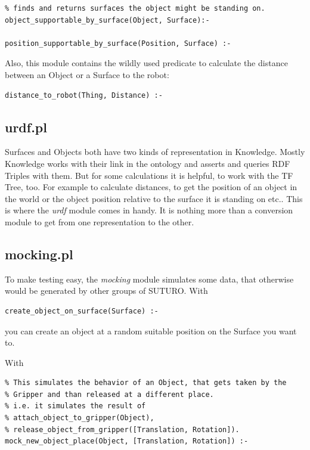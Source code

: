 \documentclass[main.tex]{subfiles}
\begin{document}
\begin{lstlisting}
% finds and returns surfaces the object might be standing on.
object_supportable_by_surface(Object, Surface):-

position_supportable_by_surface(Position, Surface) :-
\end{lstlisting}

Also, this module contains the wildly used predicate to calculate the distance between an Object or a Surface to the robot:

\begin{lstlisting}
distance_to_robot(Thing, Distance) :-
\end{lstlisting}

\subsection{urdf.pl}

Surfaces and Objects both have two kinds of representation in Knowledge. Mostly Knowledge works with their link in the ontology and asserts and queries RDF Triples with them. But for some calculations it is helpful, to work with the TF Tree, too. For example to calculate distances, to get the position of an object in the world or the object position relative to the surface it is standing on etc.. This is where the \textit{urdf} module comes in handy. It is nothing more than a conversion module to get from one representation to the other.

\subsection{mocking.pl}

To make testing easy, the \textit{mocking} module simulates some data, that otherwise would be generated by other groups of SUTURO. With

\begin{lstlisting}
create_object_on_surface(Surface) :-
\end{lstlisting}

you can create an object at a random suitable position on the Surface you want to. 

With 

\begin{lstlisting}
% This simulates the behavior of an Object, that gets taken by the 
% Gripper and than released at a different place.
% i.e. it simulates the result of
% attach_object_to_gripper(Object),
% release_object_from_gripper([Translation, Rotation]).
mock_new_object_place(Object, [Translation, Rotation]) :-
\end{lstlisting}
\end{document}
